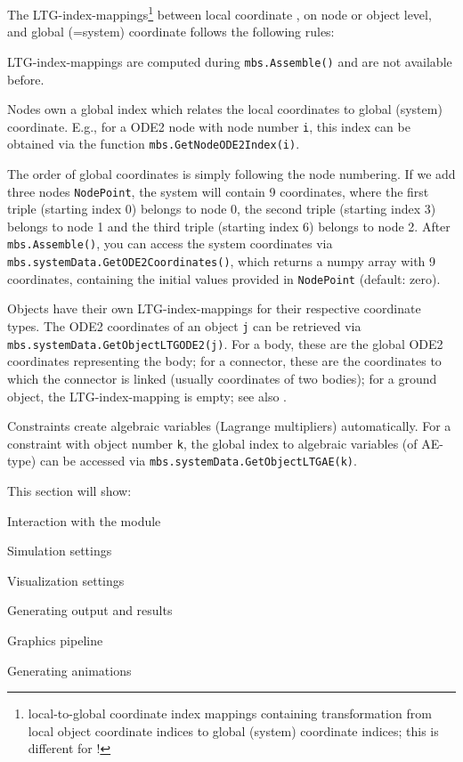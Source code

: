 %
The \ac{LTG}-index-mappings\footnote{local-to-global coordinate index mappings containing transformation from local object coordinate indices to global (system) coordinate indices; this is different for !} between local coordinate , on node or object level, and global (=system) coordinate  follows the following rules:
\bi
\item \ac{LTG}-index-mappings are computed during \texttt{mbs.Assemble()} and are not available before.
\item Nodes own a global index which relates the local coordinates to global (system) coordinate. E.g., for a \ac{ODE2} node with node number \texttt{i}, this index can be obtained via the function \texttt{mbs.GetNodeODE2Index(i)}.
\item The order of global coordinates is simply following the node numbering. If we add three nodes \texttt{NodePoint}, the system will contain 9 coordinates, where the first triple (starting index 0) belongs to node 0, the second triple (starting index 3) belongs to node 1 and the third triple (starting index 6) belongs to node 2. After \texttt{mbs.Assemble()}, you can access the system coordinates via \texttt{mbs.systemData.GetODE2Coordinates()}, which returns a numpy array with 9 coordinates, containing the initial values provided in \texttt{NodePoint} (default: zero).
\item Objects have their own \ac{LTG}-index-mappings for their respective coordinate types. The \ac{ODE2} coordinates of an object \texttt{j} can be retrieved via \texttt{mbs.systemData.GetObjectLTGODE2(j)}. For a body, these are the global \ac{ODE2} coordinates representing the body; for a connector, these are the coordinates to which the connector is linked (usually coordinates of two bodies); for a ground object, the \ac{LTG}-index-mapping is empty; see also .
\item Constraints create algebraic variables (Lagrange multipliers) automatically. For a constraint with object number \texttt{k}, the global index to algebraic variables (of \ac{AE}-type) can be accessed via \texttt{mbs.systemData.GetObjectLTGAE(k)}.
\ei

This section will show:
\bi
  \item Interaction with the \codeName module
  \item Simulation settings
  \item Visualization settings
  \item Generating output and results
  \item Graphics pipeline
  \item Generating animations
\ei

